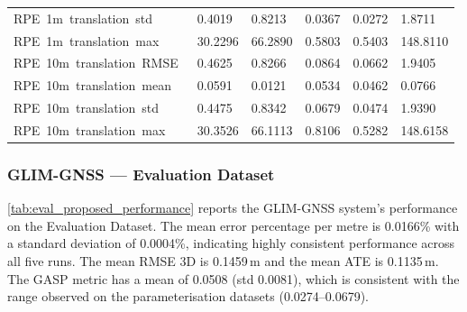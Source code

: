 \begin{table}[htbp]
\begin{tabularx}{\textwidth}{lXXXXX}
RPE\ 1m\ translation\ std\   & 0.4019  & 0.8213  & 0.0367  & 0.0272 & 1.8711   \\
RPE\ 1m\ translation\ max\   & 30.2296 & 66.2890 & 0.5803  & 0.5403 & 148.8110 \\
RPE\ 10m\ translation\ RMSE\ & 0.4625  & 0.8266  & 0.0864  & 0.0662 & 1.9405   \\
RPE\ 10m\ translation\ mean\ & 0.0591  & 0.0121  & 0.0534  & 0.0462 & 0.0766   \\
RPE\ 10m\ translation\ std\  & 0.4475  & 0.8342  & 0.0679  & 0.0474 & 1.9390   \\
RPE\ 10m\ translation\ max\  & 30.3526 & 66.1113 & 0.8106  & 0.5282 & 148.6158 \\ \bottomrule
\end{tabularx}
\end{table}

\subsubsection{GLIM-GNSS --- Evaluation Dataset}

\cref{tab:eval_proposed_performance} reports the GLIM-GNSS system's performance on the Evaluation Dataset. The mean error percentage per metre is 0.0166\% with a standard deviation of 0.0004\%, indicating highly consistent performance across all five runs. The mean RMSE 3D is 0.1459\,m and the mean ATE is 0.1135\,m. The GASP metric has a mean of 0.0508 (std 0.0081), which is consistent with the range observed on the parameterisation datasets (0.0274--0.0679).

